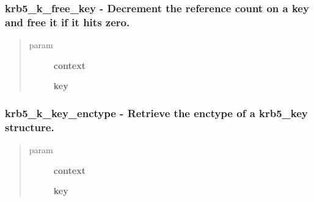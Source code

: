 \documentclass[letterpaper,10pt,english]{sphinxmanual}
\begin{document}
\subsubsection{krb5\_k\_free\_key -  Decrement the reference count on a key and free it if it hits zero.}
\label{appdev/refs/api/krb5_k_free_key:krb5-k-free-key-decrement-the-reference-count-on-a-key-and-free-it-if-it-hits-zero}\label{appdev/refs/api/krb5_k_free_key::doc}

\begin{fulllineitems}
\label{appdev/refs/api/krb5_k_free_key:krb5_k_free_key}
\end{fulllineitems}

\begin{quote}\begin{description}
\item[{param}] \leavevmode
\textbf{context}

\textbf{key}

\end{description}\end{quote}


\subsubsection{krb5\_k\_key\_enctype -  Retrieve the enctype of a krb5\_key structure.}
\label{appdev/refs/api/krb5_k_key_enctype::doc}\label{appdev/refs/api/krb5_k_key_enctype:krb5-k-key-enctype-retrieve-the-enctype-of-a-krb5-key-structure}

\begin{fulllineitems}
\label{appdev/refs/api/krb5_k_key_enctype:krb5_k_key_enctype}
\end{fulllineitems}

\begin{quote}\begin{description}
\item[{param}] \leavevmode
\textbf{context}

\textbf{key}

\end{description}\end{quote}
\end{document}

